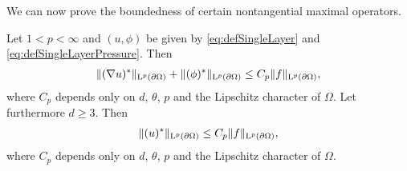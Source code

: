 
We can now prove the boundedness of certain nontangential maximal operators.
\begin{lem}
  \label{lem:nontangentialMaximalFunctions}
  Let $1 < p < \infty$ and $(u,\phi)$ be given by \eqref{eq:defSingleLayer} and \eqref{eq:defSingleLayerPressure}.
  Then 
  \begin{align}
    \| (\nabla u)^* \|_{\mathrm{L}^p(\partial\Omega)}  +  \| (\phi)^* \|_{\mathrm{L}^p(\partial\Omega)} \leq C_p \|f\|_{\mathrm{L}^p(\partial\Omega)},
  \end{align}
  where $C_p$ depends only on $d$, $\theta$, $p$ and the Lipschitz character of $\Omega$.
  Let furthermore $d \geq 3$. Then
  \begin{align*}
     \|(u)^*\|_{\mathrm{L}^p(\partial\Omega)} \leq C_p \|f\|_{\mathrm{L}^p(\partial\Omega)},
  \end{align*}
  where $C_p$ depends only on $d$, $\theta$, $p$ and the Lipschitz character of $\Omega$.
\end{lem}


